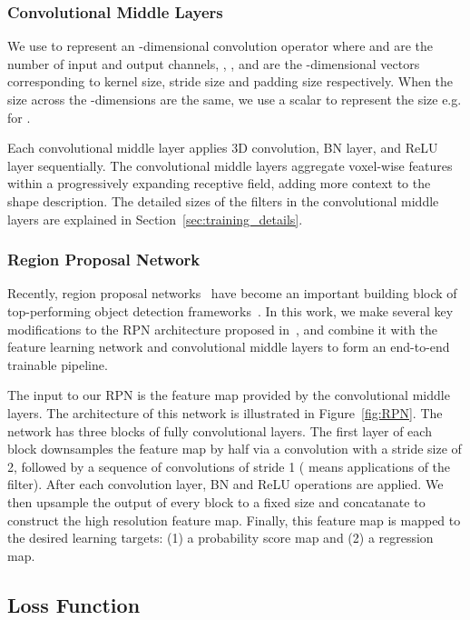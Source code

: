 \documentclass[10pt,twocolumn,letterpaper]{article}
\begin{document}
\subsubsection{Convolutional Middle Layers}
We use  to represent an -dimensional convolution operator where   and  are the number of input and output channels, , , and  are the -dimensional vectors corresponding to kernel size, stride size and padding size respectively. When the size across the -dimensions are the same, we use a scalar to represent the size e.g.  for . 

Each convolutional middle layer applies 3D convolution, BN layer, and ReLU layer sequentially. The convolutional middle layers aggregate voxel-wise features within a progressively expanding receptive field, adding more context to the shape description. The detailed sizes of the filters in the convolutional middle layers are explained in Section~\ref{sec:training_details}.




\subsubsection{Region Proposal Network}

 Recently, region proposal networks~\cite{REF:NIPS2015_5638} have become an important building block of top-performing object detection frameworks~\cite{REF:DeepSlidingShapes,REF:cvpr17chen,REF:focalloss}. In this work, we make several key modifications to the  RPN architecture proposed in~\cite{REF:NIPS2015_5638}, and combine it with the feature learning network and convolutional middle layers to form an end-to-end trainable pipeline. 

The input to our RPN is the feature map provided by the convolutional middle layers.  The architecture of this network is illustrated in Figure~\ref{fig:RPN}. The network has three blocks of fully convolutional layers. The first layer of each block downsamples the feature map by half via a convolution with a stride size of 2, followed by a sequence of convolutions of stride 1 ( means  applications of the filter). After each convolution layer, BN and ReLU operations are applied. We then upsample the output of every block to a fixed size and concatanate to construct the high resolution feature map. Finally, this feature map is mapped to the desired learning targets: (1) a probability score map and (2) a regression map. 




\subsection{Loss Function}
\end{document}
